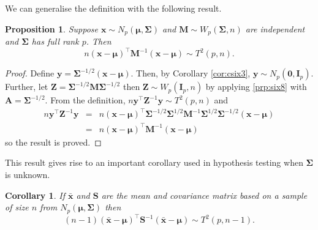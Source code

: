 \documentclass[]{book}
\newtheorem{corollary}{Corollary}[chapter]
\newtheorem{proposition}{Proposition}[chapter]
\theoremstyle{definition}
\theoremstyle{definition}
\theoremstyle{definition}
\theoremstyle{remark}
\begin{document}
We can generalise the definition with the following result.

\begin{proposition}
\protect\hypertarget{prp:six13}{}{\label{prp:six13} }Suppose \(\boldsymbol x\sim N_p(\boldsymbol \mu,\boldsymbol \Sigma)\) and \(\boldsymbol M\sim W_p(\boldsymbol \Sigma,n)\) are independent and
\(\boldsymbol \Sigma\) has full rank \(p\). Then
\[ n (\boldsymbol x-\boldsymbol \mu)^\top \boldsymbol M^{-1} (\boldsymbol x-\boldsymbol \mu) \sim T^2(p,n). \]
\end{proposition}

\begin{proof}
{}Define \(\boldsymbol y= \boldsymbol \Sigma^{-1/2}(\boldsymbol x-\boldsymbol \mu)\). Then, by Corollary \ref{cor:csix3}, \(\boldsymbol y\sim N_p(\boldsymbol 0,\mathbf I_p)\). Further, let \(\boldsymbol Z= \boldsymbol \Sigma^{-1/2} \boldsymbol M\boldsymbol \Sigma^{-1/2}\) then \(\boldsymbol Z\sim W_p(\mathbf I_p,n)\) by applying \ref{prp:six8} with \(\boldsymbol A= \boldsymbol \Sigma^{-1/2}\). From the definition, \(n \boldsymbol y^\top \boldsymbol Z^{-1} \boldsymbol y\sim T^2(p,n)\) and
\begin{eqnarray*}
n \boldsymbol y^\top \boldsymbol Z^{-1} \boldsymbol y&=& n (\boldsymbol x-\boldsymbol \mu)^\top \boldsymbol \Sigma^{-1/2} \boldsymbol \Sigma^{1/2} \boldsymbol M^{-1} \boldsymbol \Sigma^{1/2} \boldsymbol \Sigma^{-1/2} (\boldsymbol x-\boldsymbol \mu) \\
&=& n(\boldsymbol x-\boldsymbol \mu)^\top \boldsymbol M^{-1}(\boldsymbol x-\boldsymbol \mu)
\end{eqnarray*}
so the result is proved.
\end{proof}

This result gives rise to an important corollary used in hypothesis testing when \(\boldsymbol \Sigma\) is unknown.

\begin{corollary}
\protect\hypertarget{cor:csix5}{}{\label{cor:csix5} }If \(\bar{\boldsymbol x}\) and \(\boldsymbol S\) are the mean and covariance matrix based on a sample of size \(n\) from \(N_p(\boldsymbol \mu,\boldsymbol \Sigma)\) then
\[ (n-1)(\bar{\boldsymbol x}-\boldsymbol \mu)^\top \boldsymbol S^{-1} (\bar{\boldsymbol x}-\boldsymbol \mu) \sim T^2(p,n-1).\]
\end{corollary}
\end{document}
